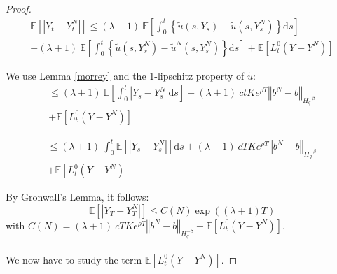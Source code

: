 \documentclass{article}[12pt]
\newcommand{\norme}[1]{\left\Vert #1\right\Vert}
\newcommand{\E}{\mathbb{E}}
\newcommand{\di}{\mathrm{d}}
\begin{document}
\begin{proof}
    \begin{multline*}
    \E\left[\left|Y_t-Y_t^N\right|\right]\leq (\lambda + 1)\ \E\left[\int_0^t\left\{\tilde{u}\left(s,Y_s\right)-\tilde{u}\left(s,Y_s^N\right)\right\} \di s\right]\\ +(\lambda + 1)\ \E\left[\int_0^t\left\{\tilde{u}\left(s,Y_s^N\right)-\tilde{u}^N\left(s,Y_s^N\right)\right\} \di s\right] + \E \left[L_t^0(Y-Y^N)\right]
    \end{multline*}
    
    We use Lemma \ref{morrey} and the 1-lipschitz property of $\tilde{u}$:
    \begin{multline*}
    \leq (\lambda + 1)\ \E\left[\int_0^t\left|Y_s-Y_s^N\right| \di s\right] +(\lambda + 1)\ ctKe^{\rho T}\norme{b^N-b}_{H^{-\beta}_{q}}\\ + \E \left[L_t^0(Y-Y^N)\right]
    \end{multline*}
    
    \begin{multline*}
    \leq (\lambda + 1)\ \int_0^t\E\left[\left|Y_s-Y_s^N\right|\right] \di s + (\lambda + 1)\ cTKe^{\rho T}\norme{b^N-b}_{H^{-\beta}_{q}}\\ + \E \left[L_t^0(Y-Y^N)\right]
    \end{multline*}
    
    By Gronwall's Lemma, it follows:
    \begin{equation}
    \E\left[\left|Y_T-Y_T^N\right|\right] \leq C(N) \exp((\lambda+1)T)
    \end{equation}
    with $C(N) = (\lambda + 1)\ cTKe^{\rho T}\norme{b^N-b}_{H^{-\beta}_{q}} + \E \left[L_t^0(Y-Y^N)\right].$      
    
    \paragraph{}
    We now have to study the term $\E \left[L_t^0(Y-Y^N)\right]$.
\end{proof}
        
        
        
\end{document}
